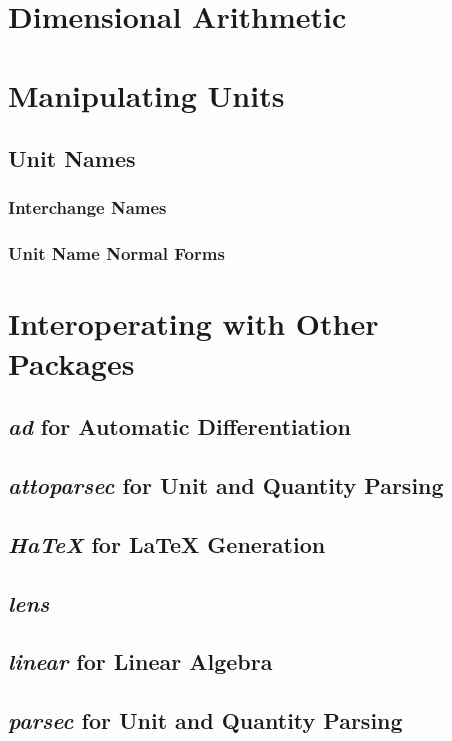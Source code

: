 \documentclass[12pt]{report}
\newcommand{\packagename}[1]{\textit{#1}}
\begin{document}
\chapter{Dimensional Arithmetic}

\chapter{Manipulating Units}

\section{Unit Names}

\subsection{Interchange Names}
\subsection{Unit Name Normal Forms}

\chapter{Interoperating with Other Packages}

\section{\packagename{ad} for Automatic Differentiation}
\section{\packagename{attoparsec} for Unit and Quantity Parsing}
\section{\packagename{HaTeX} for \LaTeX{} Generation}
\section{\packagename{lens}}
\section{\packagename{linear} for Linear Algebra}
\section{\packagename{parsec} for Unit and Quantity Parsing}
\end{document}
